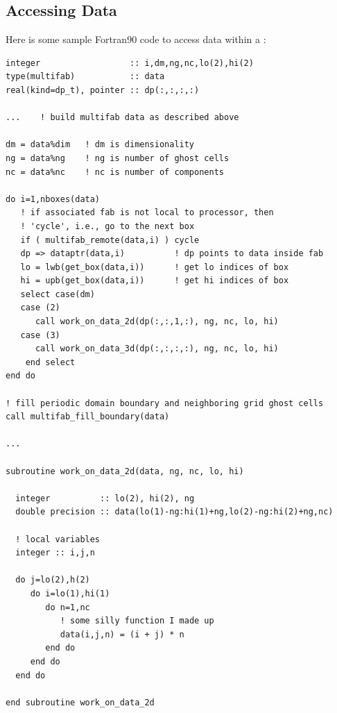 \subsection{Accessing Data}
Here is some sample Fortran90 code to access data within a \MultiFab:
\begin{lstlisting}[language={[gnu]make},mathescape=false]
integer                  :: i,dm,ng,nc,lo(2),hi(2)
type(multifab)           :: data
real(kind=dp_t), pointer :: dp(:,:,:,:)

...    ! build multifab data as described above

dm = data%dim   ! dm is dimensionality
ng = data%ng    ! ng is number of ghost cells
nc = data%nc    ! nc is number of components

do i=1,nboxes(data)
   ! if associated fab is not local to processor, then
   ! 'cycle', i.e., go to the next box
   if ( multifab_remote(data,i) ) cycle
   dp => dataptr(data,i)          ! dp points to data inside fab
   lo = lwb(get_box(data,i))      ! get lo indices of box
   hi = upb(get_box(data,i))      ! get hi indices of box
   select case(dm)
   case (2)
      call work_on_data_2d(dp(:,:,1,:), ng, nc, lo, hi)
   case (3)
      call work_on_data_3d(dp(:,:,:,:), ng, nc, lo, hi)
    end select
end do

! fill periodic domain boundary and neighboring grid ghost cells
call multifab_fill_boundary(data)  

...

subroutine work_on_data_2d(data, ng, nc, lo, hi)

  integer          :: lo(2), hi(2), ng
  double precision :: data(lo(1)-ng:hi(1)+ng,lo(2)-ng:hi(2)+ng,nc)

  ! local variables
  integer :: i,j,n

  do j=lo(2),h(2)
     do i=lo(1),hi(1)
        do n=1,nc
           ! some silly function I made up
           data(i,j,n) = (i + j) * n
        end do
     end do
  end do

end subroutine work_on_data_2d
\end{lstlisting}

